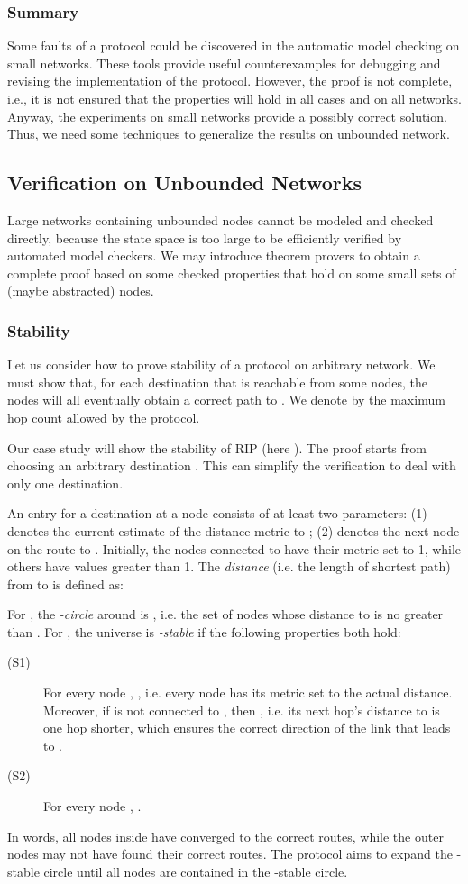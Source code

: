 \documentclass[a4paper,10pt,twocolumn]{article}
\begin{document}
\subsubsection{Summary}
Some faults of a protocol could be discovered in the automatic model checking on small networks. These tools provide useful counterexamples for debugging and revising the implementation of the protocol. However, the proof is not complete, i.e., it is not ensured that the properties will hold in all cases and on all networks. Anyway, the experiments on small networks provide a possibly correct solution. Thus, we need some techniques to generalize the results on unbounded network.

\subsection{Verification on Unbounded Networks}
Large networks containing unbounded nodes cannot be modeled and checked directly, because the state space is too large to be efficiently verified by automated model checkers. We may introduce theorem provers to obtain a complete proof based on some checked properties that hold on some small sets of (maybe abstracted) nodes.

\subsubsection{Stability}
Let us consider how to prove stability of a protocol on arbitrary network. We must show that, for each destination  that is reachable from some nodes, the nodes will all eventually obtain a correct path to . We denote by  the maximum hop count allowed by the protocol.

Our case study will show the stability of RIP (here ). The proof starts from choosing an arbitrary destination . This can simplify the verification to deal with only one destination.

An entry for a destination  at a node  consists of at least two parameters: (1)  denotes the current estimate of the distance metric to ; (2)  denotes the next node on the route to . Initially, the nodes connected to  have their metric set to 1, while others have values greater than 1. The \emph{distance} (i.e. the length of shortest path) from  to  is defined as:

For , the \emph{-circle} around  is , i.e. the set of nodes whose distance to  is no greater than . For , the universe is \emph{-stable} if the following properties both hold:
\begin{description}
  \item[(S1)] For every node , , i.e. every node  has its metric set to the actual distance. Moreover, if  is not connected to , then , i.e. its next hop's distance to  is one hop shorter, which ensures the correct direction of the link that leads to .
  \item[(S2)] For every node , .
\end{description}
In words, all nodes inside  have converged to the correct routes, while the outer nodes may not have found their correct routes. The protocol aims to expand the -stable circle until all nodes are contained in the -stable circle.
\end{document}
